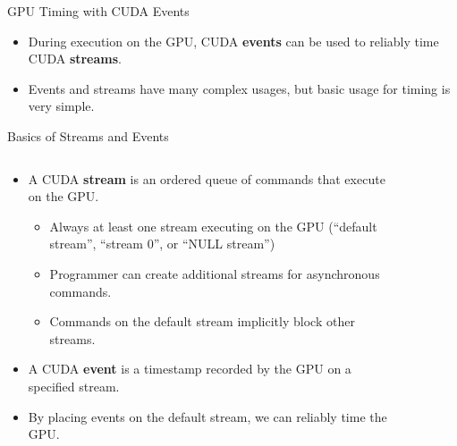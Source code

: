 \documentclass{beamer}
\begin{document}
    \begin{frame}{GPU Timing with CUDA Events}
        \begin{itemize}
            \item During execution on the GPU, CUDA \textbf{events} can be used to reliably time CUDA \textbf{streams}.
            \item Events and streams have many complex usages, but basic usage for timing is very simple.
        \end{itemize}
    \end{frame}

    \begin{frame}{Basics of Streams and Events}
        \begin{columns}
            \begin{column}{0.6\textwidth}
                \begin{itemize}
                    \item A CUDA \textbf{stream} is an ordered queue of commands that execute on the GPU.
                    \begin{itemize}
                        \item Always at least one stream executing on the GPU (``default stream'', ``stream 0'', or ``NULL stream'')
                        \item Programmer can create additional streams for asynchronous commands.
                        \item Commands on the default stream implicitly block other streams.
                    \end{itemize}
                    \item A CUDA \textbf{event} is a timestamp recorded by the GPU on a specified stream.
                    \item By placing events on the default stream, we can reliably time the GPU.
                \end{itemize}
            \end{column}
            \begin{column}{0.4\textwidth}
                \begin{figure}
                    \centering

\end{figure}
\end{column}
\end{columns}
\end{frame}
\end{document}
